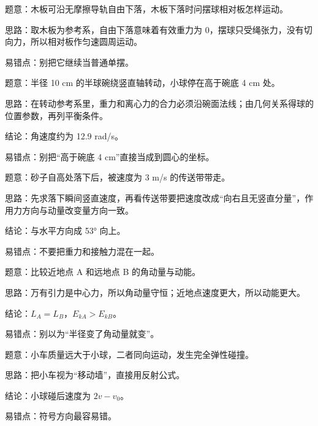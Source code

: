 \documentclass[12pt,a4paper]{ctexart}
\begin{document}
\begin{tcolorbox}[colback=white,colframe=black!55,title={1. 木板自由下落时，板上单摆相对木板如何运动}]
题意：木板可沿无摩擦导轨自由下落，木板下落时问摆球相对板怎样运动。\par
思路：取木板为参考系，自由下落意味着有效重力为 0，摆球只受绳张力，没有切向力，所以相对板作匀速圆周运动。\par
易错点：别把它继续当普通单摆。\par
\end{tcolorbox}

\begin{tcolorbox}[colback=white,colframe=black!55,title={2. 半球碗匀速转动，小球在碗内某高度处相对碗静止，求角速度}]
题意：半径 10 cm 的半球碗绕竖直轴转动，小球停在高于碗底 4 cm 处。\par
思路：在转动参考系里，重力和离心力的合力必须沿碗面法线；由几何关系得球的位置参数，再列平衡条件。\par
结论：角速度约为 12.9 rad/s。\par
易错点：别把“高于碗底 4 cm”直接当成到圆心的坐标。\par
\end{tcolorbox}

\begin{tcolorbox}[colback=white,colframe=black!55,title={3. 砂子落到向右运动的传送带上，求传送带对砂子的作用方向}]
题意：砂子自高处落下后，被速度为 3 m/s 的传送带带走。\par
思路：先求落下瞬间竖直速度，再看传送带要把速度改成“向右且无竖直分量”，作用力方向与动量改变量方向一致。\par
结论：与水平方向成 53° 向上。\par
易错点：不要把重力和接触力混在一起。\par
\end{tcolorbox}

\begin{tcolorbox}[colback=white,colframe=black!55,title={4. 椭圆轨道卫星在近地点和远地点的角动量与动能比较}]
题意：比较近地点 A 和远地点 B 的角动量与动能。\par
思路：万有引力是中心力，所以角动量守恒；近地点速度更大，所以动能更大。\par
结论：\(L_A=L_B\)，\(E_{kA}>E_{kB}\)。\par
易错点：别以为“半径变了角动量就变”。\par
\end{tcolorbox}

\begin{tcolorbox}[colback=white,colframe=black!55,title={5. 小球与远重于它、同向滑行的小车完全弹碰后的小球速度}]
题意：小车质量远大于小球，二者同向运动，发生完全弹性碰撞。\par
思路：把小车视为“移动墙”，直接用反射公式。\par
结论：小球碰后速度为 \(2v-v_0\)。\par
易错点：符号方向最容易错。\par
\end{tcolorbox}
\end{document}
